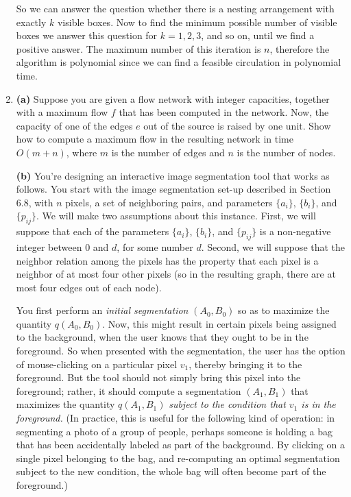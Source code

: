 \documentclass[12pt]{article}
\begin{document}
\begin{enumerate}
{\bigskip

So we can answer the question whether there is
a nesting arrangement with exactly $k$ visible boxes.
Now to find the minimum possible number of visible boxes we answer
this question for $k=1,2,3$, and so on, until we find a positive answer.
The maximum number of this iteration is $n$, therefore the algorithm is
polynomial since we can find a feasible circulation in polynomial time.

}


\item 

{\bf (a)}
Suppose you are given a flow network with integer capacities,
together with a maximum flow $f$ that has been computed in the network.
Now, the capacity of one of the edges $e$ out of the source
is raised by one unit.
Show how to compute a maximum flow in the resulting network
in time $O(m + n)$, where $m$ is the number of edges
and $n$ is the number of nodes.

{\bf (b)}
You're designing an interactive image segmentation tool
that works as follows.
You start with the image segmentation set-up described in Section 6.8,
with $n$ pixels, a set of neighboring pairs, and parameters
$\{a_i\}$, $\{b_i\}$, and $\{p_{ij}\}$.
We will make two assumptions about this instance.
First, we will suppose that each of the parameters
$\{a_i\}$, $\{b_i\}$, and $\{p_{ij}\}$
is a non-negative integer between $0$ and $d$,
for some number $d$.
Second, we will suppose that the neighbor relation
among the pixels has the property
that each pixel is a neighbor of at most four other pixels
(so in the resulting graph, there are at most four edges out of each node).

You first perform an {\em initial segmentation} $(A_0,B_0)$
so as to maximize the quantity $q(A_0,B_0)$.
Now, this might result in certain pixels
being assigned to the background, when the user
knows that they ought to be in the foreground.
So when presented with the segmentation, the user has
the option of mouse-clicking on a particular pixel $v_1$,
thereby bringing it to the foreground.
But the tool should not simply bring this pixel
into the foreground;
rather, it should compute a segmentation $(A_1,B_1)$
that maximizes the quantity $q(A_1,B_1)$
{\em subject to the condition that $v_1$ is in the foreground.}
(In practice, this is useful for the following kind of operation:
in segmenting a photo of a group of people, perhaps someone is holding a bag
that has been accidentally labeled as part of the background.
By clicking on a single pixel belonging to the bag,
and re-computing an optimal segmentation subject to the new condition,
the whole bag will often become part of the foreground.)


\end{enumerate}
\end{document}
